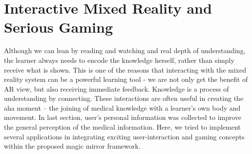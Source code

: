 
\section{Interactive Mixed Reality and Serious Gaming} \label{sec:3-PPMM:IMR}
Although we can lean by reading and watching and real depth of understanding, the learner always needs to encode the knowledge herself, rather than simply receive what is shown. This is one of the reasons that interacting with the mixed reality system can be a powerful learning tool - we are not only get the benefit of AR view, but also receiving immediate feedback. Knowledge is a process of understanding by connecting. These interactions are often useful in creating the aha moment -- the joining of medical knowledge with a learner's own body and movement.
In last section, user's personal information was collected to improve the general perception of the medical information.
Here, we tried to implement several applications in integrating exciting user-interaction and gaming concepts within the proposed magic mirror framework.
 
